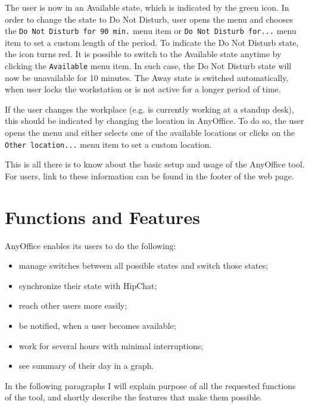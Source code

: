 \documentclass[11pt,singleside]{myfithesis2}
\begin{document}
The user is now in an Available state, which is indicated by the green icon. In order to change the state to Do Not Disturb, user opens the menu and chooses the \texttt{Do Not Disturb for 90 min.} menu item or \texttt{Do Not Disturb for...} menu item to set a custom length of the period. To indicate the Do Not Disturb state, the icon turns red. It is possible to switch to the Available state anytime by clicking the \texttt{Available} menu item. In such case, the Do Not Disturb state will now be unavailable for 10 minutes. The Away state is switched automatically, when user locks the workstation or is not active for a longer period of time.

If the user changes the workplace (e.g. is currently working at a standup desk), this should be indicated by changing the location in AnyOffice. To do so, the user opens the menu and either selects one of the available locations or clicks on the \texttt{Other location...} menu item to set a custom location.

This is all there is to know about the basic setup and usage of the AnyOffice tool. For users, link to these information can be found in the footer of the web page.


	\section{Functions and Features}
AnyOffice enables its users to do the following:
\begin{itemize}
	\item manage switches between all possible states and switch those states;
	\item synchronize their state with HipChat;
	\item reach other users more easily;
	\item be notified, when a user becomes available;
	\item work for several hours with minimal interruptions;
	\item see summary of their day in a graph.
\end{itemize}
	In the following paragraphs I will explain purpose of all the requested functions of the tool, and shortly describe the features that make them possible.
	
\end{document}
